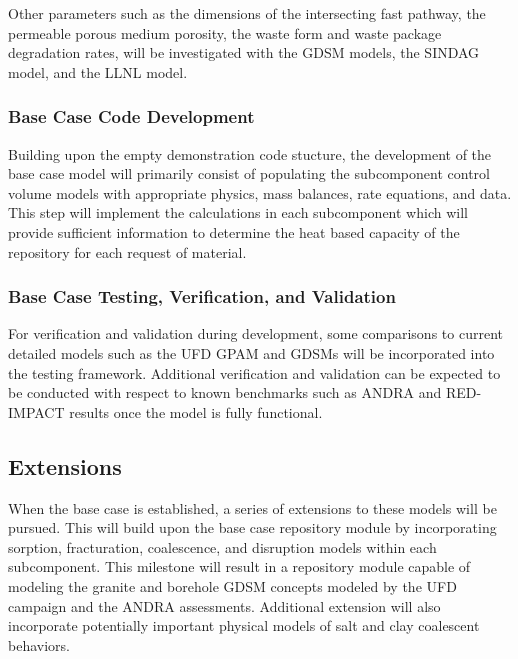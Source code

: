 \clearpage


Other parameters such as the dimensions of the intersecting fast pathway, the 
permeable porous medium porosity, the waste form and waste package degradation 
rates, will be investigated with the \gls{GDSM} models, the \gls{SINDAG} model, 
and the \gls{LLNL} model. 

\subsubsection{Base Case Code Development}

  
  Building upon the empty demonstration code stucture, the development of the 
  base case model will primarily consist of populating the subcomponent control 
  volume models with appropriate physics, mass balances, rate equations, and 
  data. This step will implement the calculations in each subcomponent which 
  will provide sufficient information to determine the heat based capacity of 
  the repository for each request of material. 
 
  
  
\subsubsection{Base Case Testing, Verification, and Validation}

   

  For verification and validation during development, some comparisons to current 
  detailed models such as the \gls{UFD} \gls{GPAM} and GDSMs will be 
  incorporated into the testing framework. Additional verification and 
  validation can be expected to be conducted with respect to known benchmarks 
  such as \gls{ANDRA} and RED-IMPACT results once the model is fully functional.


\subsection{Extensions}


When the base case is established, a series of extensions to these models will 
be pursued.  This will build upon the base case repository module by 
incorporating sorption, fracturation, coalescence, and disruption 
models within each subcomponent.  This milestone will result in a repository 
module capable of modeling the granite and borehole \gls{GDSM} concepts modeled 
by the \gls{UFD} campaign and the \gls{ANDRA} assessments. Additional extension 
will also incorporate potentially important physical models of salt and clay
coalescent behaviors. 

